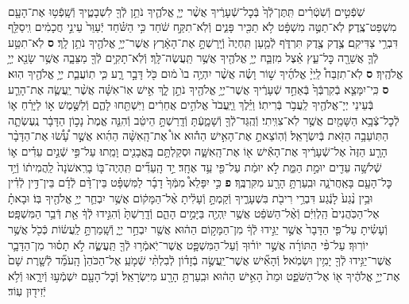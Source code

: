 \documentclass[twoside, openany, parskip=half, 11pt]{book}
\begin{document}
\begin{sometimes}
\begin{footnotesize}
\begin{multicols}{2}
\\
שֹֽׁפְֿטִ֣ים וְֿשֹֽׁטְֿרִ֗ים תִּֽתֶּן־לְֿךָ֙ בְּֿכׇל־שְֿׁעָרֶ֔יךָ אֲשֶׁ֨ר יְיָ֧ אֱלֹהֶ֛יךָ נֹתֵ֥ן לְֿךָ֖ לִשְׁבָטֶ֑יךָ וְֿשָֽׁפְֿט֥וּ אֶת־הָעָ֖ם מִשְׁפַּט־צֶֽדֶק׃ לֹֽא־תַטֶּ֣ה מִשְׁפָּ֔ט לֹ֥א תַכִּ֖יר פָּנִ֑ים וְֿלֹֽא־תִקַּ֣ח שֹׁ֔חַד כִּ֣י הַשֹּׁ֗חַד יְֿעַוֵּר֙ עֵינֵ֣י חֲכָמִ֔ים וִֽיסַלֵּ֖ף דִּבְרֵ֥י צַדִּיקִֽם׃ צֶ֥דֶק צֶ֖דֶק תִּרְדֹּ֑ף לְֿמַ֤עַן תִּֽחְיֶה֙ וְֿיָֽרַשְׁתָּ֣ אֶת־הָאָ֔רֶץ אֲשֶׁר־יְיָ֥ אֱלֹהֶ֖יךָ נֹתֵ֥ן לָֽךְ׃ \textbf{ס}
לֹֽא־תִטַּ֥ע לְֿךָ֛ אֲשֵׁרָ֖ה כׇּל־עֵ֑ץ אֵ֗צֶל מִזְבַּ֛ח יְיָ֥ אֱלֹהֶ֖יךָ אֲשֶׁ֥ר תַּֽעֲשֶׂה־לָּֽךְ׃ וְֿלֹֽא־תָקִ֥ים לְֿךָ֖ מַצֵּבָ֑ה אֲשֶׁ֥ר שָׂנֵ֖א יְיָ֥ אֱלֹהֶֽיךָ׃ \textbf{ס} לֹֽא־תִזְבַּח֩ לַֽיְיָ֨ אֱלֹהֶ֜יךָ שׁ֣וֹר וָשֶׂ֗ה אֲשֶׁ֨ר יִהְיֶ֥ה בוֹ֙ מ֔וּם כֹּ֖ל דָּבָ֣ר רָ֑ע כִּ֧י תֽוֹעֲבַ֛ת יְיָ֥ אֱלֹהֶ֖יךָ הֽוּא׃ \textbf{ס} כִּֽי־יִמָּצֵ֤א בְֿקִרְבְּֿךָ֙ בְּֿאַחַ֣ד שְֿׁעָרֶ֔יךָ אֲשֶׁר־יְיָ֥ אֱלֹהֶ֖יךָ נֹתֵ֣ן לָ֑ךְ אִ֣ישׁ אֽוֹ־אִשָּׁ֗ה אֲשֶׁ֨ר יַֽעֲשֶׂ֧ה אֶת־הָרַ֛ע בְּֿעֵינֵי יְיָ־אֱלֹהֶ֖יךָ לַֽעֲבֹ֥ר בְּֿרִיתֽוֹ׃ וַיֵּ֗לֶךְ וַֽיַּֽעֲבֹד֙ אֱלֹהִ֣ים אֲחֵרִ֔ים וַיִּשְׁתַּ֖חוּ לָהֶ֑ם וְֿלַשֶּׁ֣מֶשׁ א֣וֹ לַיָּרֵ֗חַ א֛וֹ לְֿכׇל־צְֿבָ֥א הַשָּׁמַ֖יִם אֲשֶׁ֥ר לֹֽא־צִוִּֽיתִי׃ וְֿהֻֽגַּד־לְֿךָ֖ וְֿשָׁמָ֑עְֿתָּ וְֿדָֽרַשְׁתָּ֣ הֵיטֵ֔ב וְֿהִנֵּ֤ה אֱמֶת֙ נָכ֣וֹן הַדָּבָ֔ר נֶֽעֶשְׂתָ֛ה הַתּֽוֹעֵבָ֥ה הַזֹּ֖את בְּֿיִשְׂרָאֵֽל׃ וְֿהֽוֹצֵאתָ֣ אֶת־הָאִ֣ישׁ הַה֡וּא אוֹ֩ אֶת־הָֽאִשָּׁ֨ה הַהִ֜וא אֲשֶׁ֣ר עָ֠שׂ֠וּ אֶת־הַדָּבָ֨ר הָרָ֤ע הַזֶּה֙ אֶל־שְֿׁעָרֶ֔יךָ אֶת־הָאִ֕ישׁ א֖וֹ אֶת־הָֽאִשָּׁ֑ה וּסְקַלְתָּ֥ם בָּֽאֲבָנִ֖ים וָמֵֽתוּ׃ עַל־פִּ֣י שְֿׁנַ֣יִם עֵדִ֗ים א֛וֹ שְֿׁלשָׁ֥ה עֵדִ֖ים יוּמַ֣ת הַמֵּ֑ת לֹ֣א יוּמַ֔ת עַל־פִּ֖י עֵ֥ד אֶחָֽד׃ יַ֣ד הָֽעֵדִ֞ים תִּֽהְיֶה־בּ֤וֹ בָרִֽאשֹׁנָה֙ לַֽהֲמִית֔וֹ וְֿיַ֥ד כׇּל־הָעָ֖ם בָּאַֽחֲרֹנָ֑ה וּבִֽעַרְתָּ֥ הָרָ֖ע מִקִּרְבֶּֽךָ׃ \textbf{פ}
כִּ֣י יִפָּלֵא֩ מִמְּֿךָ֙ דָבָ֜ר לַמִּשְׁפָּ֗ט בֵּין־דָּ֨ם לְֿדָ֜ם בֵּין־דִּ֣ין לְֿדִ֗ין וּבֵ֥ין נֶ֨גַע֙ לָנֶ֔גַע דִּבְרֵ֥י רִיבֹ֖ת בִּשְׁעָרֶ֑יךָ וְֿקַמְתָּ֣ וְֿעָלִ֔יתָ אֶ֨ל־הַמָּק֔וֹם אֲשֶׁ֥ר יִבְחַ֛ר יְיָ֥ אֱלֹהֶ֖יךָ בּֽוֹ׃ וּבָאתָ֗ אֶל־הַכֹּֽהֲנִים֙ הַֽלְוִיִּ֔ם וְֿאֶ֨ל־הַשֹּׁפֵ֔ט אֲשֶׁ֥ר יִֽהְיֶ֖ה בַּיָּמִ֣ים הָהֵ֑ם וְֿדָֽרַשְׁתָּ֙ וְֿהִגִּ֣ידוּ לְֿךָ֔ אֵ֖ת דְּֿבַ֥ר הַמִּשְׁפָּֽט׃ וְֿעָשִׂ֗יתָ עַל־פִּ֤י הַדָּבָר֙ אֲשֶׁ֣ר יַגִּ֣ידוּ לְֿךָ֔ מִן־הַמָּק֣וֹם הַה֔וּא אֲשֶׁ֖ר יִבְחַ֣ר יְיָ֑ וְֿשָֽׁמַרְתָּ֣ לַֽעֲשׂ֔וֹת כְּֿכֹ֖ל אֲשֶׁ֥ר יוֹרֽוּךָ׃
עַל־פִּ֨י הַתּוֹרָ֜ה אֲשֶׁ֣ר יוֹר֗וּךָ וְֿעַל־הַמִּשְׁפָּ֛ט אֲשֶׁר־יֹֽאמְֿר֥וּ לְֿךָ֖ תַּֽעֲשֶׂ֑ה לֹ֣א תָס֗וּר מִן־הַדָּבָ֛ר אֲשֶׁר־יַגִּ֥ידוּ לְֿךָ֖ יָמִ֥ין וּשְׂמֹֽאל׃ וְֿהָאִ֞ישׁ אֲשֶׁר־יַֽעֲשֶׂ֣ה בְֿזָד֗וֹן לְֿבִלְתִּ֨י שְֿׁמֹ֤עַֽ אֶל־הַכֹּהֵן֙ הָֽעֹמֵ֞ד לְֿשָׁ֤רֶת שָׁם֙ אֶת־יְיָ֣ אֱלֹהֶ֔יךָ א֖וֹ אֶל־הַשֹּׁפֵ֑ט וּמֵת֙ הָאִ֣ישׁ הַה֔וּא וּבִֽעַרְתָּ֥ הָרָ֖ע מִיִּשְׂרָאֵֽל׃ וְֿכׇל־הָעָ֖ם יִשְׁמְֿע֣וּ וְֿיִרָ֑אוּ וְֿלֹ֥א יְֿזִיד֖וּן עֽוֹד׃


\end{multicols}
\end{footnotesize}
\end{sometimes}
\end{document}
